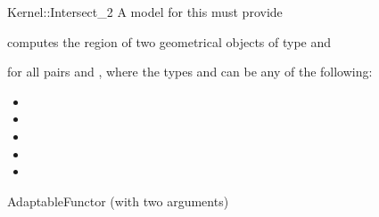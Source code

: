 \begin{ccRefFunctionObjectConcept}{Kernel::Intersect_2}
A model for this must provide


{computes the  region of two geometrical objects of type 
 and }

for all pairs  and , where
the types  and  can be any of the
following:
\begin{itemize}
\item {}
\item {}
\item {}
\item {}
\item {}
\end{itemize}

\ccRefines
AdaptableFunctor (with two arguments)

\ccSeeAlso
{}\\

\end{ccRefFunctionObjectConcept}
